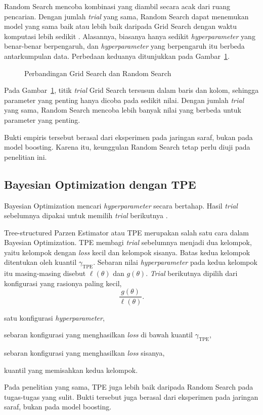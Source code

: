 Random Search mencoba kombinasi yang diambil secara acak dari ruang pencarian.
Dengan jumlah \textit{trial} yang sama, Random Search dapat menemukan model
yang sama baik atau lebih baik daripada Grid Search dengan waktu komputasi
lebih sedikit \cite{bergstra2012}. Alasannya, biasanya hanya sedikit \textit{hyperparameter} yang benar-benar
berpengaruh, dan \textit{hyperparameter} yang berpengaruh itu berbeda
antarkumpulan data.
Perbedaan keduanya ditunjukkan pada Gambar~\ref{fig:grid-random}.

\begin{figure}[!htbp]
  \centering
  \caption[Perbandingan Grid Search dan Random Search]{Perbandingan Grid Search
    dan Random Search \cite{bergstra2012}}
  \label{fig:grid-random}
\end{figure}
Pada Gambar~\ref{fig:grid-random}, titik \textit{trial} Grid Search tersusun dalam
baris dan kolom, sehingga parameter yang penting hanya dicoba pada sedikit
nilai. Dengan jumlah \textit{trial} yang sama, Random Search mencoba lebih banyak
nilai yang berbeda untuk parameter yang penting.

Bukti empiris tersebut berasal dari eksperimen pada jaringan saraf, bukan pada
model boosting. Karena itu, keunggulan Random Search tetap perlu diuji pada penelitian ini.

\subsection{Bayesian Optimization dengan TPE}
Bayesian Optimization mencari \textit{hyperparameter} secara bertahap.
Hasil \textit{trial} sebelumnya dipakai untuk memilih \textit{trial} berikutnya
\cite{bergstra2011}.

Tree-structured Parzen Estimator atau TPE merupakan salah satu cara dalam
Bayesian Optimization. TPE membagi \textit{trial} sebelumnya menjadi dua
kelompok, yaitu kelompok dengan \textit{loss} kecil dan kelompok sisanya.
Batas kedua kelompok ditentukan oleh kuantil $\gamma_{\text{TPE}}$. Sebaran
nilai \textit{hyperparameter} pada kedua kelompok itu masing-masing disebut
$\ell(\theta)$ dan $g(\theta)$. \textit{Trial} berikutnya dipilih dari
konfigurasi yang rasionya paling kecil,
\begin{equation}
  \frac{g(\theta)}{\ell(\theta)} .
  \label{eq:tpe}
\end{equation}
\begin{keterangan}
  \item[$\theta$] satu konfigurasi \textit{hyperparameter},
  \item[$\ell(\theta)$] sebaran konfigurasi yang menghasilkan
    \textit{loss} di bawah kuantil $\gamma_{\text{TPE}}$,
  \item[$g(\theta)$] sebaran konfigurasi yang menghasilkan
    \textit{loss} sisanya,
  \item[$\gamma_{\text{TPE}}$] kuantil yang memisahkan kedua kelompok.
\end{keterangan}
Pada penelitian yang sama, TPE juga lebih baik daripada Random
Search pada tugas-tugas yang sulit. Bukti tersebut juga berasal dari eksperimen pada jaringan saraf, bukan pada model boosting.



